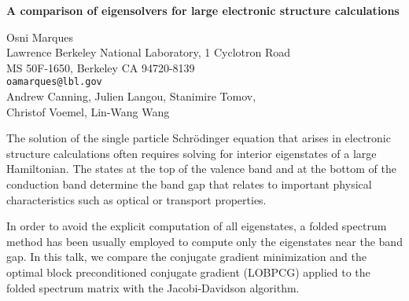 \documentclass{report}
\begin{document}

\begin{center}
{\large
{\bf A comparison of eigensolvers for large electronic structure calculations}}

	Osni Marques \\
	Lawrence Berkeley National Laboratory, 1 Cyclotron Road \\
	MS 50F-1650, Berkeley CA 94720-8139 \\
	{\tt oamarques@lbl.gov} \\
	Andrew Canning, Julien Langou, Stanimire Tomov, \\
	Christof Voemel, Lin-Wang Wang
\end{center}
The solution of the single particle Schr\"{o}dinger equation
that arises in electronic structure calculations often
requires solving for interior eigenstates of a large
Hamiltonian. The states at the top of the valence band and
at the bottom of the conduction band determine the band gap
that relates to important physical characteristics such as
optical or transport properties.

In order to avoid the
explicit computation of all eigenstates, a folded spectrum
method has been usually employed to compute only the
eigenstates near the band gap. In this talk, we compare the
conjugate gradient minimization and the optimal block
preconditioned conjugate gradient (LOBPCG) applied to the
folded spectrum matrix with the Jacobi-Davidson algorithm.



\end{document}
